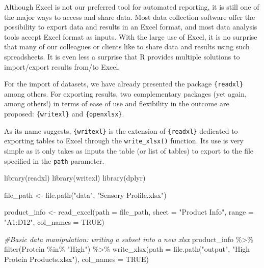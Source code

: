 \documentclass[
]{book}
\newenvironment{Shaded}{\begin{snugshade}}{\end{snugshade}}
\newcommand{\AttributeTok}[1]{\textcolor[rgb]{0.77,0.63,0.00}{#1}}
\newcommand{\CommentTok}[1]{\textcolor[rgb]{0.56,0.35,0.01}{\textit{#1}}}
\newcommand{\ConstantTok}[1]{\textcolor[rgb]{0.00,0.00,0.00}{#1}}
\newcommand{\FunctionTok}[1]{\textcolor[rgb]{0.00,0.00,0.00}{#1}}
\newcommand{\NormalTok}[1]{#1}
\newcommand{\OtherTok}[1]{\textcolor[rgb]{0.56,0.35,0.01}{#1}}
\newcommand{\SpecialCharTok}[1]{\textcolor[rgb]{0.00,0.00,0.00}{#1}}
\newcommand{\StringTok}[1]{\textcolor[rgb]{0.31,0.60,0.02}{#1}}
\begin{document}
Although Excel is not our preferred tool for automated reporting, it is still one of the major ways to access and share data. Most data collection software offer the possibility to export data and results in an Excel format, and most data analysis tools accept Excel format as inputs. With the large use of Excel, it is no surprise that many of our colleagues or clients like to share data and results using such spreadsheets. It is even less a surprise that R provides multiple solutions to import/export results from/to Excel.

For the import of datasets, we have already presented the package \texttt{\{readxl\}} among others. For exporting results, two complementary packages (yet again, among others!) in terms of ease of use and flexibility in the outcome are proposed: \texttt{\{writexl\}} and \texttt{\{openxlsx\}}.

As its name suggests, \texttt{\{writexl\}} is the extension of \texttt{\{readxl\}} dedicated to exporting tables to Excel through the \texttt{write\_xlsx()} function. Its use is very simple as it only takes as inputs the table (or list of tables) to export to the file specified in the \texttt{path} parameter.

\begin{Shaded}
\begin{Highlighting}[]
\FunctionTok{library}\NormalTok{(readxl)}
\FunctionTok{library}\NormalTok{(writexl)}
\FunctionTok{library}\NormalTok{(dplyr)}

\NormalTok{file\_path }\OtherTok{\textless{}{-}} \FunctionTok{file.path}\NormalTok{(}\StringTok{"data"}\NormalTok{, }\StringTok{"Sensory Profile.xlsx"}\NormalTok{)}

\NormalTok{product\_info }\OtherTok{\textless{}{-}} \FunctionTok{read\_excel}\NormalTok{(}\AttributeTok{path  =}\NormalTok{ file\_path,}
                           \AttributeTok{sheet =} \StringTok{"Product Info"}\NormalTok{,}
                           \AttributeTok{range =} \StringTok{"A1:D12"}\NormalTok{,}
                           \AttributeTok{col\_names =} \ConstantTok{TRUE}\NormalTok{)}

\CommentTok{\#Basic data manipulation: writing a subset into a new xlsx}
\NormalTok{product\_info }\SpecialCharTok{\%\textgreater{}\%} 
  \FunctionTok{filter}\NormalTok{(Protein }\SpecialCharTok{\%in\%} \StringTok{"High"}\NormalTok{) }\SpecialCharTok{\%\textgreater{}\%} 
  \FunctionTok{write\_xlsx}\NormalTok{(}\AttributeTok{path =} \FunctionTok{file.path}\NormalTok{(}\StringTok{"output"}\NormalTok{, }\StringTok{"High Protein Products.xlsx"}\NormalTok{),}
             \AttributeTok{col\_names =} \ConstantTok{TRUE}\NormalTok{)}
\end{Highlighting}
\end{Shaded}
\end{document}
